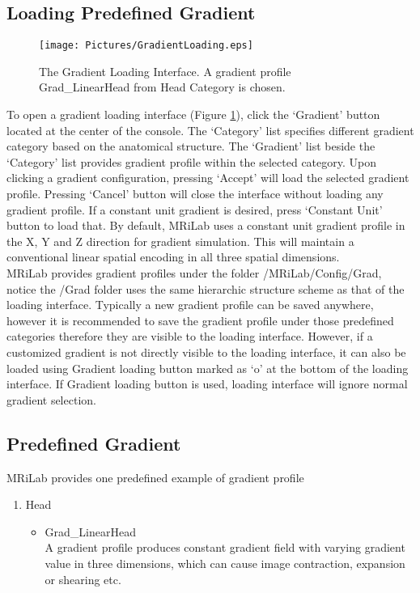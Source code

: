\documentclass{book}%
\begin{document}
\subsection{Loading Predefined Gradient}

\begin{figure}[htbp]
	\centering
		\texttt{[image: Pictures/GradientLoading.eps]}
	\caption{The Gradient Loading Interface. A gradient profile Grad\_LinearHead from Head Category is chosen.}
	\label{fig:GradientLoading}
\end{figure}

To open a gradient loading interface (Figure \ref{fig:GradientLoading}), click the `Gradient' button located at the center of the console. The `Category' list specifies different gradient category based on the anatomical structure. The `Gradient' list beside the `Category' list provides gradient profile within the selected category. Upon clicking a gradient configuration, pressing `Accept' will load the selected gradient profile. Pressing `Cancel' button will close the interface without loading any gradient profile. If a constant unit gradient is desired, press `Constant Unit' button to load that. By default, MRiLab uses a constant unit gradient profile in the X, Y and Z direction for gradient simulation. This will maintain a conventional linear spatial encoding in all three spatial dimensions. \\

MRiLab provides gradient profiles under the folder /MRiLab/Config/Grad, notice the /Grad folder uses the same hierarchic structure scheme as that of the loading interface. Typically a new gradient profile can be saved anywhere, however it is recommended to save the gradient profile under those predefined categories therefore they are visible to the loading interface. However, if a customized gradient is not directly visible to the loading interface, it can also be loaded using Gradient loading button marked as `o' at the bottom of the loading interface. If Gradient loading button is used, loading interface will ignore normal gradient selection.

\subsection{Predefined Gradient}

MRiLab provides one predefined example of gradient profile

\begin{enumerate}
		\item Head
		\begin{itemize}
			\item Grad\_LinearHead \\
			A gradient profile produces constant gradient field with varying gradient value in three dimensions, which can cause image contraction, expansion or shearing etc.
		\end{itemize}
\end{enumerate}
\end{document}
